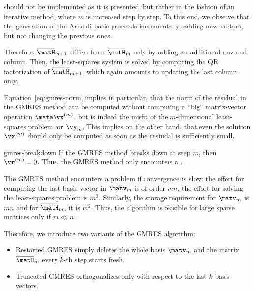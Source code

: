 \begin{remark}
   should not be implemented as it is
  presented, but rather in the fashion of an iterative method, where
  $m$ is increased step by step. To this end, we observe that the
  generation of the Arnoldi basis proceeds incrementally, adding new
  vectors, but not changing the previous ones.

  Therefore, $\overline\matH_{m+1}$ differs from $\overline\matH_{m}$
  only by adding an additional row and column. Then, the least-squares
  system is solved by computing the QR factorization of
  $\overline\matH_{m+1}$, which again amounts to updating the last
  column only.
\end{remark}

\begin{remark}
  Equation~\eqref{eq:gmres-norm} implies in particular, that the norm
  of the residual in the GMRES method can be computed without
  computing a ``big'' matrix-vector operation $\mata\vx^{(m)}$, but is
  indeed the misfit of the $m$-dimensional least-squares problem for
  $\vy_m$. This implies on the other hand, that even the solution
  $\vx^{(m)}$ should only be computed as soon as the resiudal is
  sufficiently small.
\end{remark}

\begin{Lemma}{gmres-breakdown}
  If the GMRES method breaks down at step $m$, then
  $\vr^{(m)}=0$. Thus, the GMRES method only encounters a
  .
\end{Lemma}

\begin{remark}
  The GMRES method encounters a problem if convergence is slow: the
  effort for computing the last basis vector in $\matv_m$ is of order
  $mn$, the effort for solving the least-squares problem is
  $m^3$. Similarly, the storage requirement for $\matv_m$ is $mn$ and
  for $\overline \matH_m$, it is $m^2$. Thus, the algorithm is
  feasible for large sparse matrices only if $m\ll n$.

  Therefore, we introduce two variants of the GMRES algorithm:
  \begin{itemize}
  \item Restarted GMRES simply deletes the whole basis $\matv_m$ and the matrix $\overline\matH_m$ every $k$-th step starts fresh.
  \item Truncated GMRES orthogonalizes only with respect to the last
    $k$ basis vectors.
  \end{itemize}
\end{remark}

